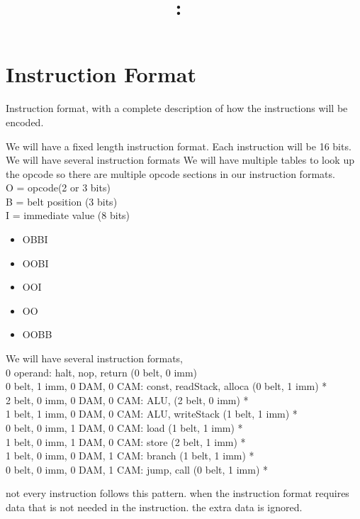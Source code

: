 \documentclass{article}
\title{
    \vspace{2in}
    \textmd{\textbf{\hmwkClass:\ \hmwkTitle}}\\
    \vspace{3in}
}
\author{\hmwkAuthorName}
\date{}
\begin{document}
\maketitle

\pagebreak

\section{Instruction Format}
Instruction format, with a complete description of how the instructions will be encoded.

We will have a fixed length instruction format. Each instruction will be 16 bits.
We will have several instruction formats
We will have multiple tables to look up the opcode so there are multiple opcode sections in our instruction formats.\\
O = opcode(2 or 3 bits)\\
B = belt position (3 bits)\\
I = immediate value (8 bits)\\
\begin{itemize}
    \item OBBI
    \item OOBI
    \item OOI
    \item OO
    \item OOBB
\end{itemize}



We will have several instruction formats,\\
0 operand: halt, nop, return                            (0 belt, 0 imm)\\
0 belt, 1 imm, 0 DAM, 0 CAM: const, readStack, alloca   (0 belt, 1 imm) *\\
2 belt, 0 imm, 0 DAM, 0 CAM: ALU,                       (2 belt, 0 imm) *\\
1 belt, 1 imm, 0 DAM, 0 CAM: ALU, writeStack            (1 belt, 1 imm) *\\
0 belt, 0 imm, 1 DAM, 0 CAM: load                       (1 belt, 1 imm) *\\
1 belt, 0 imm, 1 DAM, 0 CAM: store                      (2 belt, 1 imm) * \\
1 belt, 0 imm, 0 DAM, 1 CAM: branch                     (1 belt, 1 imm) * \\
0 belt, 0 imm, 0 DAM, 1 CAM: jump, call                 (0 belt, 1 imm) * 

not every instruction follows this pattern. when the instruction format requires data that is not needed in the instruction. the extra data is ignored.
\end{document}
